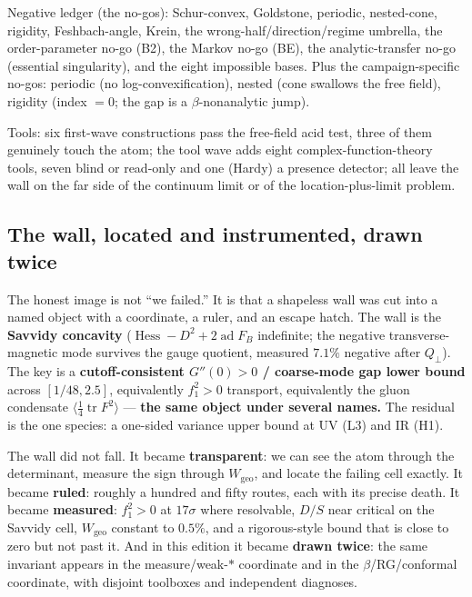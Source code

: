 Negative ledger (the no-gos): Schur-convex, Goldstone, periodic, nested-cone, rigidity,
Feshbach-angle, Krein, the wrong-half/direction/regime umbrella, the order-parameter no-go (B2),
the Markov no-go (BE), the analytic-transfer no-go (essential singularity), and the eight
impossible bases. Plus the campaign-specific no-gos: periodic (no log-convexification), nested
(cone swallows the free field), rigidity (index $=0$; the gap is a $\beta$-nonanalytic jump).

Tools: six first-wave constructions pass the free-field acid test, three of them genuinely touch
the atom; the tool wave adds eight complex-function-theory tools, seven blind or read-only and one
(Hardy) a presence detector; all leave the wall on the far side of the continuum limit or of the
location-plus-limit problem.

\subsection{The wall, located and instrumented, drawn twice}

The honest image is not ``we failed.'' It is that a shapeless wall was cut into a named object
with a coordinate, a ruler, and an escape hatch. The wall is the \textbf{Savvidy concavity}
($\operatorname{Hess}-D^2+2\operatorname{ad}F_B$ indefinite; the negative transverse-magnetic
mode survives the gauge quotient, measured $7.1\%$ negative after $Q_\perp$). The key is a
\textbf{cutoff-consistent $G''(0)>0$ / coarse-mode gap lower bound} across $[1/48,2.5]$,
equivalently $f_1^2>0$ transport, equivalently the gluon condensate
$\langle\tfrac14\operatorname{tr}F^2\rangle$ --- \textbf{the same object under several names.}
The residual is the one species: a one-sided variance upper bound at UV (L3) and IR (H1).

The wall did not fall. It became \textbf{transparent}: we can see the atom through the
determinant, measure the sign through $W_{\mathrm{geo}}$, and locate the failing cell exactly. It
became \textbf{ruled}: roughly a hundred and fifty routes, each with its precise death. It became
\textbf{measured}: $f_1^2>0$ at $17\sigma$ where resolvable, $D/S$ near critical on the Savvidy
cell, $W_{\mathrm{geo}}$ constant to $0.5\%$, and a rigorous-style bound that is close to zero but
not past it. And in this edition it became \textbf{drawn twice}: the same invariant appears in the
measure/weak-$*$ coordinate and in the $\beta$/RG/conformal coordinate, with disjoint toolboxes
and independent diagnoses.


